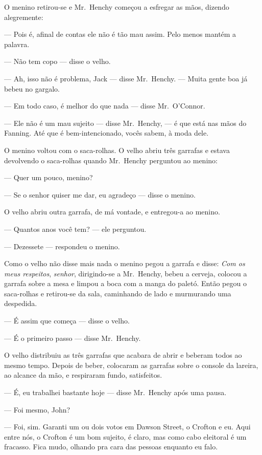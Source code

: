 O menino retirou-se e Mr.~Henchy começou a esfregar as mãos, dizendo
alegremente:

--- Pois é, afinal de contas ele não é tão mau assim.  Pelo menos mantém a
palavra.

--- Não tem copo --- disse o velho.

--- Ah, isso não é problema, Jack --- disse Mr.~Henchy.  --- Muita gente boa já
bebeu no gargalo.

--- Em todo caso, é melhor do que nada --- disse Mr.~O’Connor.

--- Ele não é um mau sujeito --- disse Mr.~Henchy, --- é que está nas mãos do
Fanning.  Até que é bem-intencionado, vocês sabem, à moda dele.

O menino voltou com o saca-rolhas.  O velho abriu três garrafas e estava
devolvendo o saca-rolhas quando Mr.~Henchy perguntou ao menino:

--- Quer um pouco, menino?

--- Se o senhor quiser me dar, eu agradeço --- disse o menino.

O velho abriu outra garrafa, de má vontade, e entregou-a ao menino.

--- Quantos anos você tem? --- ele perguntou.

--- Dezessete --- respondeu o menino.

Como o velho não disse mais nada o menino pegou a garrafa e disse: \textit{Com
os meus respeitos}, \textit{senhor}, dirigindo-se a Mr.~Henchy, bebeu a
cerveja, colocou a garrafa sobre a mesa e limpou a boca com a manga do paletó.
Então pegou o saca-rolhas e retirou-se da sala, caminhando de lado e murmurando
uma despedida.

--- É assim que começa --- disse o velho.

--- É o primeiro passo --- disse Mr.~Henchy.

O velho distribuiu as três garrafas que acabara de abrir e beberam todos ao
mesmo tempo.  Depois de beber, colocaram as garrafas sobre o console da
lareira, ao alcance da mão, e respiraram fundo, satisfeitos.

--- É, eu trabalhei bastante hoje --- disse Mr.~Henchy após uma pausa.

--- Foi mesmo, John?

--- Foi, sim.  Garanti um ou dois votos em Dawson Street, o Crofton e eu.  Aqui
entre nós, o Crofton é um bom sujeito, é claro, mas como cabo eleitoral é um
fracasso.  Fica mudo, olhando pra cara das pessoas enquanto eu falo.

